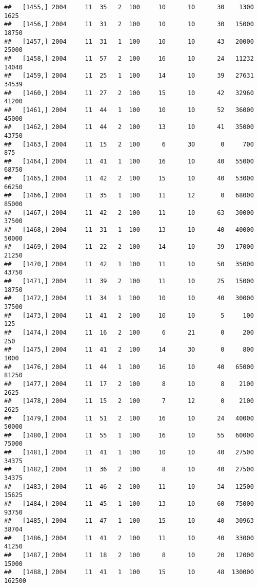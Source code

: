 \documentclass{article}\usepackage[]{graphicx}\usepackage[]{color}
\makeatletter
\newenvironment{kframe}{%
 \def\at@end@of@kframe{}%
 \ifinner\ifhmode%
  \def\at@end@of@kframe{\end{minipage}}%
  \begin{minipage}{\columnwidth}%
 \fi\fi%
 \def\FrameCommand##1{\hskip\@totalleftmargin \hskip-\fboxsep
 \colorbox{shadecolor}{##1}\hskip-\fboxsep
     \hskip-\linewidth \hskip-\@totalleftmargin \hskip\columnwidth}%
 \MakeFramed {\advance\hsize-\width
   \@totalleftmargin\z@ \linewidth\hsize
   \@setminipage}}%
 {\par\unskip\endMakeFramed%
 \at@end@of@kframe}
\newenvironment{knitrout}{}{} %
\makeatother
\begin{document}
\begin{knitrout}
\begin{kframe}
\begin{verbatim}
##   [1455,] 2004     11  35   2  100     10      10      30    1300    1625
##   [1456,] 2004     11  31   2  100     10      10      30   15000   18750
##   [1457,] 2004     11  31   1  100     10      10      43   20000   25000
##   [1458,] 2004     11  57   2  100     16      10      24   11232   14040
##   [1459,] 2004     11  25   1  100     14      10      39   27631   34539
##   [1460,] 2004     11  27   2  100     15      10      42   32960   41200
##   [1461,] 2004     11  44   1  100     10      10      52   36000   45000
##   [1462,] 2004     11  44   2  100     13      10      41   35000   43750
##   [1463,] 2004     11  15   2  100      6      30       0     700     875
##   [1464,] 2004     11  41   1  100     16      10      40   55000   68750
##   [1465,] 2004     11  42   2  100     15      10      40   53000   66250
##   [1466,] 2004     11  35   1  100     11      12       0   68000   85000
##   [1467,] 2004     11  42   2  100     11      10      63   30000   37500
##   [1468,] 2004     11  31   1  100     13      10      40   40000   50000
##   [1469,] 2004     11  22   2  100     14      10      39   17000   21250
##   [1470,] 2004     11  42   1  100     11      10      50   35000   43750
##   [1471,] 2004     11  39   2  100     11      10      25   15000   18750
##   [1472,] 2004     11  34   1  100     10      10      40   30000   37500
##   [1473,] 2004     11  41   2  100     10      10       5     100     125
##   [1474,] 2004     11  16   2  100      6      21       0     200     250
##   [1475,] 2004     11  41   2  100     14      30       0     800    1000
##   [1476,] 2004     11  44   1  100     16      10      40   65000   81250
##   [1477,] 2004     11  17   2  100      8      10       8    2100    2625
##   [1478,] 2004     11  15   2  100      7      12       0    2100    2625
##   [1479,] 2004     11  51   2  100     16      10      24   40000   50000
##   [1480,] 2004     11  55   1  100     16      10      55   60000   75000
##   [1481,] 2004     11  41   1  100     10      10      40   27500   34375
##   [1482,] 2004     11  36   2  100      8      10      40   27500   34375
##   [1483,] 2004     11  46   2  100     11      10      34   12500   15625
##   [1484,] 2004     11  45   1  100     13      10      60   75000   93750
##   [1485,] 2004     11  47   1  100     15      10      40   30963   38704
##   [1486,] 2004     11  41   2  100     11      10      40   33000   41250
##   [1487,] 2004     11  18   2  100      8      10      20   12000   15000
##   [1488,] 2004     11  41   1  100     15      10      48  130000  162500

\end{verbatim}
\end{kframe}
\end{knitrout}
\end{document}
